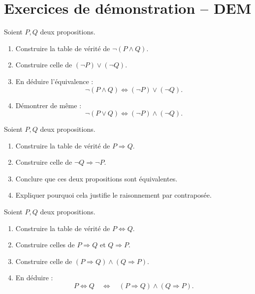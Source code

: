 \documentclass[11pt,a4paper]{article}
\newcommand{\non}{\neg}
\newcommand{\et}{\wedge}
\newcommand{\ou}{\vee}
\newcommand{\imp}{\Rightarrow}
\newcommand{\ssi}{\Longleftrightarrow}
\begin{document}
\section{Exercices de démonstration -- DEM}

\begin{exercicebox}
Soient \(P,Q\) deux propositions.

\begin{enumerate}[label=\alph*)]
    \item Construire la table de vérité de \(\non(P\et Q)\).
    \item Construire celle de \((\non P)\ou(\non Q)\).
    \item En déduire l'équivalence :
    \[
    \non(P\et Q)\ssi(\non P)\ou(\non Q).
    \]
    \item Démontrer de même :
    \[
    \non(P\ou Q)\ssi(\non P)\et(\non Q).
    \]
\end{enumerate}
\end{exercicebox}

\begin{exercicebox}
Soient \(P,Q\) deux propositions.

\begin{enumerate}[label=\alph*)]
    \item Construire la table de vérité de \(P\imp Q\).
    \item Construire celle de \(\non Q\imp\non P\).
    \item Conclure que ces deux propositions sont équivalentes.
    \item Expliquer pourquoi cela justifie le raisonnement par contraposée.
\end{enumerate}
\end{exercicebox}

\begin{exercicebox}
Soient \(P,Q\) deux propositions.

\begin{enumerate}[label=\alph*)]
    \item Construire la table de vérité de \(P\ssi Q\).
    \item Construire celles de \(P\imp Q\) et \(Q\imp P\).
    \item Construire celle de \((P\imp Q)\et(Q\imp P)\).
    \item En déduire :
    \[
    P\ssi Q\quad\ssi\quad (P\imp Q)\et(Q\imp P).
    \]
\end{enumerate}
\end{exercicebox}
\end{document}
